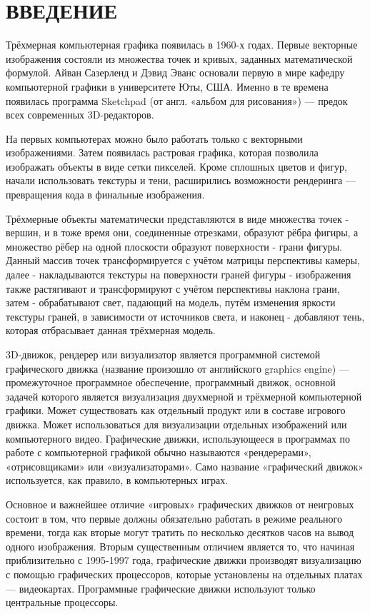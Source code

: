 \section*{ВВЕДЕНИЕ}

Трёхмерная компьютерная графика появилась в 1960-х годах. Первые векторные изображения состояли из множества точек и кривых, заданных математической формулой. Айван Сазерленд и Дэвид Эванс основали первую в мире кафедру компьютерной графики в университете Юты, США. Именно в те времена появилась программа Sketchpad (от англ. «альбом для рисования») — предок всех современных 3D-редакторов.

На первых компьютерах можно было работать только с векторными изображениями. Затем появилась растровая графика, которая позволила изображать объекты в виде сетки пикселей. Кроме сплошных цветов и фигур, начали использовать текстуры и тени, расширились возможности рендеринга — превращения кода в финальные изображения.

Трёхмерные объекты математически представляются в виде множества точек - вершин, и в тоже время они, соединенные отрезками, образуют рёбра фигиры, а множество рёбер на одной плоскости образуют поверхности - грани фигуры. Данный массив точек трансформируется с учётом матрицы перспективы камеры, далее - накладываются текстуры на поверхности граней фигуры - изображения также растягивают и трансформируют с учётом перспективы наклона грани, затем - обрабатывают свет, падающий на модель, путём изменения яркости текстуры граней, в зависимости от источников света, и наконец - добавляют тень, которая отбрасывает данная трёхмерная модель.

3D-движок, рендерер или визуализатор является программной системой графического движка (название произошло от английского graphics engine) — промежуточное программное обеспечение, программный движок, основной задачей которого является визуализация двухмерной и трёхмерной компьютерной графики. Может существовать как отдельный продукт или в составе игрового движка. Может использоваться для визуализации отдельных изображений или компьютерного видео. Графические движки, использующееся в программах по работе с компьютерной графикой обычно называются «рендерерами», «отрисовщиками» или «визуализаторами». Само название «графический движок» используется, как правило, в компьютерных играх.

Основное и важнейшее отличие «игровых» графических движков от неигровых состоит в том, что первые должны обязательно работать в режиме реального времени, тогда как вторые могут тратить по несколько десятков часов на вывод одного изображения. Вторым существенным отличием является то, что начиная приблизительно с 1995-1997 года, графические движки производят визуализацию с помощью графических процессоров, которые установлены на отдельных платах — видеокартах. Программные графические движки используют только центральные процессоры.

